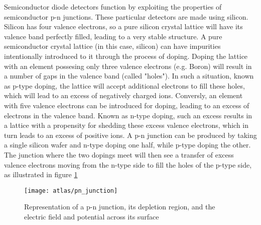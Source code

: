         

        Semiconductor diode detectors function by exploiting the properties of semiconductor p-n junctions.
        These particular detectors are made using silicon.
        Silicon has four valence electrons, so a pure silicon crystal lattice will have its valence band perfectly filled, leading to a very stable structure.
        A pure semiconductor crystal lattice (in this case, silicon) can have impurities intentionally introduced to it through the process of doping.
        Doping the lattice with an element possesing only three valence electrons (e.g. Boron) will result in a number of gaps in the valence band (called "holes").
        In such a situation, known as p-type doping, the lattice will accept additional electrons to fill these holes, which will lead to an excess of negatively charged ions.
        Conversly, an element with five valence electrons can be introduced for doping, leading to an excess of electrons in the valence band.
        Known as n-type doping, such an excess results in a lattice with a propensity for shedding these excess valence electrons, which in turn leads to an excess of positive ions.
        A p-n junction can be produced by taking a single silicon wafer and n-type doping one half, while p-type doping the other.
        The junction where the two dopings meet will then see a transfer of excess valence electrons moving from the n-type side to fill the holes of the p-type side, as illustrated in figure \ref{fig:pn_junction}

        \begin{figure}
            \texttt{[image: atlas/pn\_junction]}
            \caption{Representation of a p-n junction, its depletion region, and the electric field and potential across its surface \cite{Havránek:2317324}}
            \label{fig:pn_junction}
        \end{figure}

